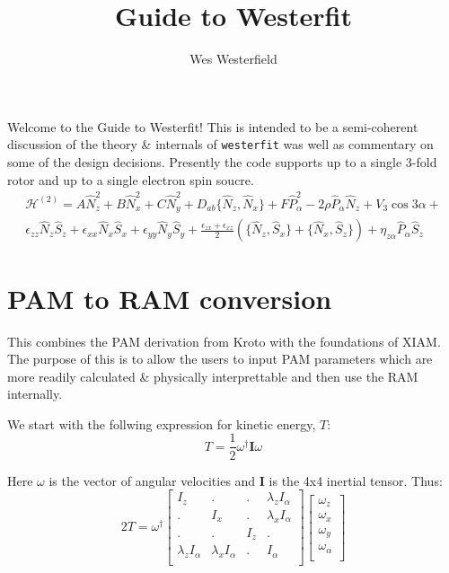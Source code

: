 \documentclass{article}
\title{Guide to  Westerfit}
\author{Wes Westerfield}
\begin{document}
\maketitle

Welcome to the Guide to Westerfit! This is intended to be a semi-coherent discussion of the theory \& internals of \verb=westerfit= was well as commentary on some of the design decisions. Presently the code supports up to a single 3-fold rotor and up to a single electron spin soucre.
\begin{multline}
	\mathscr{H}^{(2)} = A\hat{N}_{z}^{2} + B\hat{N}_{x}^{2} + C\hat{N}_{y}^{2} + D_{ab} \{\hat{N}_{z},\hat{N}_{x}\} + F\hat{P}_{\alpha}^{2} - 2\rho\hat{P}_{\alpha}\hat{N}_{z} + V_{3}\cos3\alpha + \\ \epsilon_{zz}\hat{N}_{z}\hat{S}_{z} + \epsilon_{xx}\hat{N}_{x}\hat{S}_{x} + \epsilon_{yy}\hat{N}_{y}\hat{S}_{y} + \frac{\epsilon_{zx}+\epsilon_{xz}}{2}(\{\hat{N}_{z},\hat{S}_{x}\} + \{\hat{N}_{x},\hat{S}_{z}\}) + \eta_{z\alpha} \hat{P}_{\alpha}\hat{S}_{z}
\end{multline}

\section{PAM to RAM conversion}
This combines the PAM derivation from Kroto with the foundations of XIAM. The purpose of this is to allow the users to input PAM parameters which are more readily calculated \& physically interprettable and then use the RAM internally.

We start with the follwing expression for kinetic energy, $T$:
\begin{equation}
	T = \frac{1}{2}\omega^{\dagger}\mathbf{I}\omega
\end{equation}

Here $\omega$ is the vector of angular velocities and $\mathbf{I}$ is the 4x4 inertial tensor. Thus:
\begin{equation}
	2T = \omega^{\dagger}
	\begin{bmatrix}
		I_{z} & . & . & \lambda_{z}I_{\alpha} \\
		. & I_{x} & . & \lambda_{x}I_{\alpha} \\
		. & . & I_{z} & . \\
		\lambda_{z}I_{\alpha} & \lambda_{x}I_{\alpha} & . & I_{\alpha} \\
	\end{bmatrix}
	\begin{bmatrix}
		\omega_{z} \\
		\omega_{x} \\
		\omega_{y} \\
		\omega_{\alpha} \\
	\end{bmatrix}
\end{equation}
\end{document}
